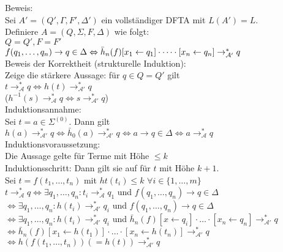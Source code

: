 \documentclass[titlepage]{article}
\begin{document}
Beweis:\\
Sei $A' = (Q', \Gamma, F', \Delta')$ ein vollst\"andiger DFTA mit $L(A') = L$.\\
Definiere $A = (Q, \Sigma, F, \Delta)$ wie folgt:\\
$Q = Q', F = F'$\\
$f(q_1, \dots, q_n) \to q \in \Delta \\
\Leftrightarrow \bar{h}_n (f)[x_1 \leftarrow q_1] \cdot \dots \cdot 
[x_n \leftarrow q_n] \to_{\mathcal{A}'}^\ast q$\\

Beweis der Korrektheit (strukturelle Induktion):\\
Zeige die st\"arkere Aussage: f\"ur $q \in Q = Q'$ gilt \\
$t \to_\mathcal{A}^\ast q \Leftrightarrow h(t) \to_{\mathcal{A}'}^\ast q$\\
($h^{-1}(s) \to_\mathcal{A}^\ast q \Leftrightarrow s \to_{\mathcal{A}'}^\ast q$)\\

Induktionsannahme:\\
Sei $t = a \in \Sigma^{(0)}$. Dann gilt
$h(a) \to_{\mathcal{A}'}^\ast q \Leftrightarrow
\bar{h}_0(a) \to_{\mathcal{A}'}^\ast q \Leftrightarrow
a \to q \in \Delta \Leftrightarrow a \to_\mathcal{A}^\ast q$\\

Induktionsvoraussetzung:\\
Die Aussage gelte f\"ur Terme mit H\"ohe $\leq k$\\

Induktionsschritt: Dann gilt sie auf f\"ur $t$ mit H\"ohe $k+1$.\\
Sei $t = f(t_1, \dots, t_n)$ mit $ht(t_i) \leq k$ $\forall i \in \{1, \dots, m\}$\\

$t \to_\mathcal{A}^\ast q \Leftrightarrow \exists q_1, \dots, q_n: t_i \to_\mathcal{A}^\ast q_1$
und $f(q_1, \dots, q_n) \to q \in \Delta$\\
$\Leftrightarrow \exists q_1, \dots, q_n: h(t_i) \to_{\mathcal{A}'}^\ast q_i$ und
$f(q_1, \dots, q_n) \to q \in \Delta$ \\
$\Leftrightarrow \exists q_1, \dots, q_n: h(t_i) \to_{\mathcal{A}'}^\ast q_i$ und
$\bar{h}_n(f)[x \leftarrow q_i] \cdot \dots \cdot [x_n \leftarrow q_n] \to_{\mathcal{A}'}^\ast q$\\
$\Leftrightarrow \bar{h}_n(f)[x_1 \leftarrow h(t_1)] \cdot \dots \cdot 
[x_n \leftarrow h(t_n)] \to_{\mathcal{A}'}^\ast q$\\
$\Leftrightarrow h(f(t_1, \dots, t_n)) (=h(t)) \to_{\mathcal{A}'}^\ast q$
\end{document}
